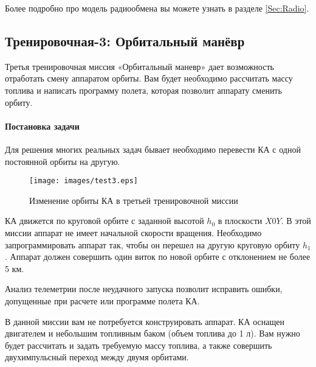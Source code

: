 \documentclass[12pt,a4paper]{article}
\begin{document}
Более подробно про модель радиообмена вы можете узнать в разделе \ref{Sec:Radio}.

\clearpage
\subsection{Тренировочная-3: Орбитальный манёвр}
\label{Sec:Maneuvre}

Третья тренировочная миссия «Орбитальный маневр» дает возможность отработать смену
аппаратом орбиты. Вам будет необходимо рассчитать массу топлива и написать программу
полета, которая позволит аппарату сменить орбиту.

\paragraph{Постановка задачи}

Для решения многих реальных задач бывает необходимо перевести КА с одной постоянной орбиты
на другую.

\begin{figure}[tbh]
  \begin{center}
    \texttt{[image: images/test3.eps]}
    \caption{Изменение орбиты КА в третьей тренировочной миссии}
    \label{Pic:Test-3}
  \end{center}
\end{figure}

КА движется по круговой орбите с заданной высотой $h_0$ в плоскости $X0Y$. В этой миссии
аппарат не имеет начальной скорости вращения. Необходимо запрограммировать аппарат так,
чтобы он перешел на другую круговую орбиту $h_1$. Аппарат должен совершить один виток по
новой орбите с отклонением не более 5 км.

Анализ телеметрии после неудачного запуска позволит исправить ошибки, допущенные при
расчете или программе полета КА.

В данной миссии вам не потребуется конструировать аппарат. КА оснащен двигателем и
небольшим топливным баком (объем топлива до 1 л). Вам нужно будет рассчитать и задать
требуемую массу топлива, а также совершить двухимпульсный переход между двумя орбитами.
\end{document}
